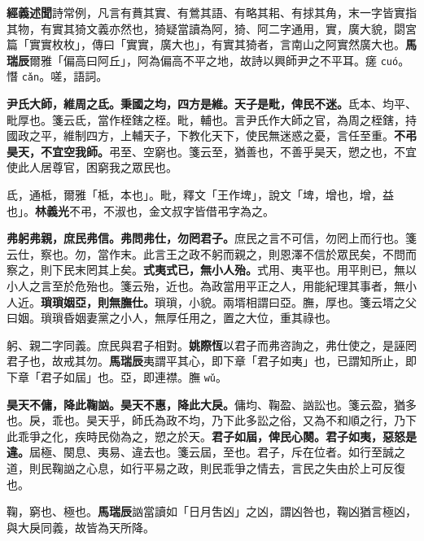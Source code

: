 \begin{quoting}\textbf{經義述聞}詩常例，凡言有蕡其實、有鶯其語、有略其耜、有捄其角，末一字皆實指其物，有實其猗文義亦然也，猗疑當讀為阿，猗、阿二字通用，實，廣大貌，閟宮篇「實實枚枚」，傳曰「實實，廣大也」，有實其猗者，言南山之阿實然廣大也。\textbf{馬瑞辰}爾雅「偏高曰阿丘」，阿為偏高不平之地，故詩以興師尹之不平耳。瘥 \texttt{cuó}。憯 \texttt{cǎn}。嗟，語詞。\end{quoting}

\textbf{尹氏大師，維周之氐。秉國之均，四方是維。天子是毗，俾民不迷。}{\footnotesize 氐本、均平、毗厚也。箋云氐，當作桎鎋之桎。毗，輔也。言尹氏作大師之官，為周之桎鎋，持國政之平，維制四方，上輔天子，下教化天下，使民無迷惑之憂，言任至重。}\textbf{不弔昊天，不宜空我師。}{\footnotesize 弔至、空窮也。箋云至，猶善也，不善乎昊天，愬之也，不宜使此人居尊官，困窮我之眾民也。}

\begin{quoting}氐，通柢，爾雅「柢，本也」。毗，釋文「王作埤」，說文「埤，增也，增，益也」。\textbf{林義光}不弔，不淑也，金文叔字皆借弔字為之。\end{quoting}

\textbf{弗躬弗親，庶民弗信。弗問弗仕，勿罔君子。}{\footnotesize 庶民之言不可信，勿罔上而行也。箋云仕，察也。勿，當作末。此言王之政不躬而親之，則恩澤不信於眾民矣，不問而察之，則下民末罔其上矣。}\textbf{式夷式已，無小人殆。}{\footnotesize 式用、夷平也。用平則已，無以小人之言至於危殆也。箋云殆，近也。為政當用平正之人，用能紀理其事者，無小人近。}\textbf{瑣瑣姻亞，則無膴仕。}{\footnotesize 瑣瑣，小貌。兩壻相謂曰亞。膴，厚也。箋云壻之父曰姻。瑣瑣昏姻妻黨之小人，無厚任用之，置之大位，重其祿也。}

\begin{quoting}躬、親二字同義。庶民與君子相對。\textbf{姚際恆}以君子而弗咨詢之，弗仕使之，是誣罔君子也，故戒其勿。\textbf{馬瑞辰}夷謂平其心，即下章「君子如夷」也，已謂知所止，即下章「君子如屆」也。亞，即連襟。膴 \texttt{wǔ}。\end{quoting}

\textbf{昊天不傭，降此鞠訩。昊天不惠，降此大戾。}{\footnotesize 傭均、鞠盈、訩訟也。箋云盈，猶多也。戾，乖也。昊天乎，師氏為政不均，乃下此多訟之俗，又為不和順之行，乃下此乖爭之化，疾時民俲為之，愬之於天。}\textbf{君子如屆，俾民心闋。君子如夷，惡怒是違。}{\footnotesize 屆極、闋息、夷易、違去也。箋云屆，至也。君子，斥在位者。如行至誠之道，則民鞠訩之心息，如行平易之政，則民乖爭之情去，言民之失由於上可反復也。}

\begin{quoting}鞠，窮也、極也。\textbf{馬瑞辰}訩當讀如「日月吿凶」之凶，謂凶咎也，鞠凶猶言極凶，與大戾同義，故皆為天所降。\end{quoting}

